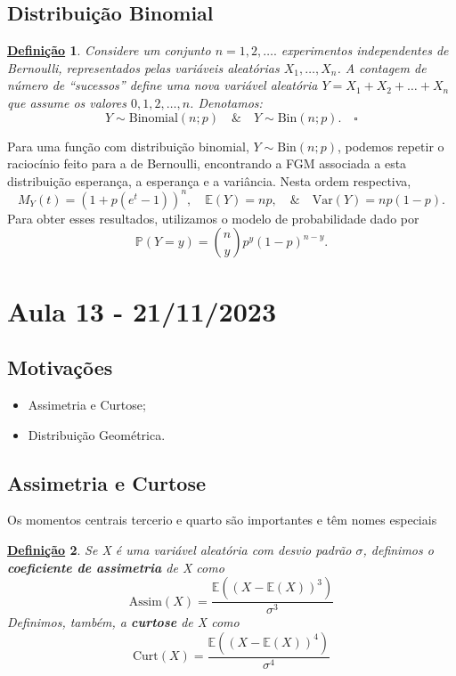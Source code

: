 \documentclass{article}
\newtheorem*{def*}{\underline{Defini\c c\~ao}}
\begin{document}
\subsection{Distribuição Binomial}
 \begin{def*}
   Considere um conjunto \(n=1, 2, \dotsc.\) experimentos independentes de Bernoulli, representados pelas variáveis aleatórias \(X_{1}, \dotsc, X_{n}\). A contagem de número de ``sucessos''
  define uma nova variável aleatória \(Y = X_{1} + X_{2} + \dotsc + X_{n}\) que assume os valores \(0, 1, 2, \dotsc, n\). Denotamos:
    \[
      Y \sim \mathrm{Binomial}(n; p)\quad\&\quad Y \sim \mathrm{Bin}(n; p).\quad\square
    \]
 \end{def*}
 Para uma função com distribuição binomial, \(Y\sim \mathrm{Bin}(n; p)\), podemos repetir o raciocínio feito para a de Bernoulli, encontrando a FGM associada a esta distribuição esperança, a esperança e a variância.
Nesta ordem respectiva, 
  \[
    M_{Y}(t) = (1+p(e^{t}-1))^{n},\quad \mathbb{E}(Y) = np,\quad\&\quad \mathrm{Var}(Y) = np(1-p).
  \]
  Para obter esses resultados, utilizamos o modelo de probabilidade dado por 
    \[
      \mathbb{P}(Y=y) = \binom{n}{y}p^{y}(1-p)^{n-y}.
    \]
\newpage

\section{Aula 13 - 21/11/2023}
\subsection{Motivações}
\begin{itemize}
  \item Assimetria e Curtose;
  \item Distribuição Geométrica.
\end{itemize}
\subsection{Assimetria e Curtose}
  Os momentos centrais tercerio e quarto são importantes e têm nomes especiais
\begin{def*}
  Se X é uma variável aleatória com desvio padrão \(\sigma \), definimos o \textbf{coeficiente de assimetria} de X como 
  \[
    \mathrm{Assim}(X) = \frac{\mathbb{E}((X-\mathbb{E}(X))^{3})}{\sigma^{3}}
  \]
  Definimos, também, a \textbf{curtose}\footnotemark[1] de X como 
  \[
    \mathrm{Curt}(X) = \frac{\mathbb{E}((X-\mathbb{E}(X))^{4})}{\sigma^{4}}
  \]
\end{def*}
\end{document}
